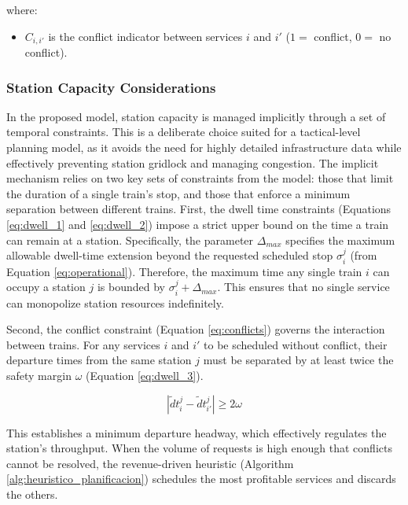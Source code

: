 \documentclass[Afour,sagev,times]{sagej}
\begin{document}
where:
\begin{itemize}
  \item $C_{i,i'}$ is the conflict indicator between services $i$ and $i'$ ($1=$ conflict, $0=$ no conflict).
\end{itemize}

\subsubsection{Station Capacity Considerations}
\label{sec:station_capacity}

In the proposed model, station capacity is managed implicitly through a set of temporal constraints. This is a deliberate choice suited for a tactical-level planning model, as it avoids the need for highly detailed infrastructure data while effectively preventing station gridlock and managing congestion. The implicit mechanism relies on two key sets of constraints from the model: those that limit the duration of a single train's stop, and those that enforce a minimum separation between different trains. First, the dwell time constraints (Equations \ref{eq:dwell_1} and \ref{eq:dwell_2}) impose a strict upper bound on the time a train can remain at a station. Specifically, the parameter $\Delta_{max}$ specifies the maximum allowable dwell-time extension beyond the requested scheduled stop $\sigma_{i}^{j}$ (from Equation \ref{eq:operational}). Therefore, the maximum time any single train $i$ can occupy a station $j$ is bounded by $\sigma_{i}^{j} + \Delta_{max}$. This ensures that no single service can monopolize station resources indefinitely.

Second, the conflict constraint (Equation \ref{eq:conflicts}) governs the interaction between trains. For any services $i$ and $i'$ to be scheduled without conflict, their departure times from the same station $j$ must be separated by at least twice the safety margin $\omega$ (Equation \ref{eq:dwell_3}).

\begin{equation}
|\tilde{d}t_{i}^{j} - \tilde{d}t_{i'}^{j}| \ge 2\omega
\label{eq:dwell_3}
\end{equation}

This establishes a minimum departure headway, which effectively regulates the station’s throughput. When the volume of requests is high enough that conflicts cannot be resolved, the revenue-driven heuristic (Algorithm \ref{alg:heuristico_planificacion}) schedules the most profitable services and discards the others.
\end{document}
